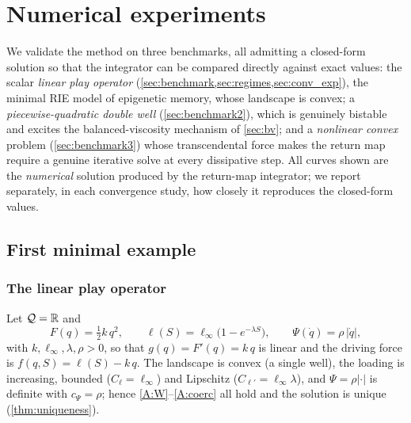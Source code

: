 \section{Numerical experiments}\label{sec:experiments}

We validate the method on three benchmarks, all admitting a closed-form
solution so that the integrator can be compared directly against exact
values: the scalar \emph{linear play operator}
(\cref{sec:benchmark,sec:regimes,sec:conv_exp}), the minimal RIE model
of epigenetic memory, whose landscape is convex; a
\emph{piecewise-quadratic double well} (\cref{sec:benchmark2}), which
is genuinely bistable and excites the balanced-viscosity mechanism of
\cref{sec:bv}; and a \emph{nonlinear convex} problem
(\cref{sec:benchmark3}) whose transcendental force makes the return map
require a genuine iterative solve at every dissipative step. All curves
shown are the \emph{numerical} solution produced by the return-map
integrator; we report separately, in each convergence study, how closely
it reproduces the closed-form values.

\subsection{First minimal example}\label{sec:benchmark1}
\subsubsection{The linear play operator}\label{sec:benchmark}

Let $\mathcal{Q}=\mathbb{R}$ and
\begin{equation}\label{eq:benchmark}
  F(q)=\tfrac12 k\,q^2,\qquad
  \ell(S)=\ell_\infty\bigl(1-e^{-\lambda S}\bigr),\qquad
  \Psi(\dot q)=\rho\,|\dot q|,
\end{equation}
with $k,\ell_\infty,\lambda,\rho>0$, so that $g(q)=F'(q)=k\,q$ is linear
and the driving force is $f(q,S)=\ell(S)-k\,q$. The landscape is convex
(a single well), the loading is increasing, bounded
($C_\ell=\ell_\infty$) and Lipschitz ($C_{\ell'}=\ell_\infty\lambda$),
and $\Psi=\rho|\cdot|$ is definite with $c_\Psi=\rho$; hence
\ref{A:W}--\ref{A:coerc} all hold and the solution is unique
(\cref{thm:uniqueness}).

